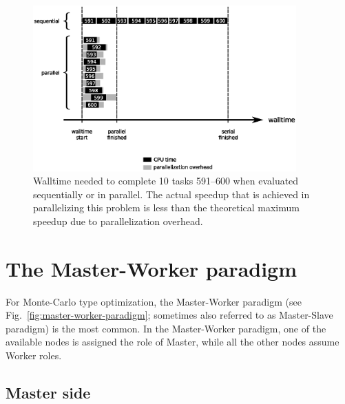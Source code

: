 \begin{figure}[htb]
  \centering
    \includegraphics[width=0.9\textwidth]{./../eps/serial-parallel-walltime.eps}
  \caption{Walltime needed to complete 10 tasks 591--600 when evaluated sequentially or in parallel. The actual speedup that is achieved in parallelizing this problem is less than the theoretical maximum speedup due to parallelization overhead. }
  \label{fig:walltime-comparison}
\end{figure}

\section{The Master-Worker paradigm}

For Monte-Carlo type optimization, the Master-Worker paradigm (see Fig.~\ref{fig:master-worker-paradigm}; sometimes also referred to as Master-Slave paradigm) is the most common. In the Master-Worker paradigm, one of the available nodes is assigned the role of Master, while all the other nodes assume Worker roles.

\subsection{Master side}

